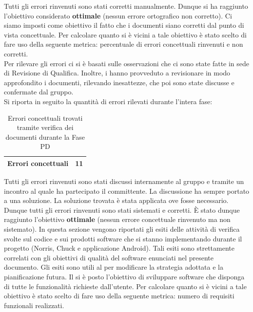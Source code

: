 				Tutti gli errori rinvenuti sono stati corretti manualmente. Dunque si ha raggiunto l'obiettivo considerato \textbf{ottimale} (nessun errore ortografico non corretto).
				Ci siamo imposti come obiettivo il fatto che i documenti siano corretti dal punto di vista concettuale. Per calcolare quanto si è vicini a tale obiettivo è stato scelto di fare uso della seguente metrica: percentuale di errori concettuali rinvenuti e non corretti.\\
				Per rilevare gli errori ci si è basati sulle osservazioni che ci sono state fatte in sede di Revisione di Qualifica. Inoltre, i  hanno provveduto a revisionare in modo approfondito i documenti, rilevando inesattezze, che poi sono state discusse e confermate dal gruppo.\\
				Si riporta in seguito la quantità di errori rilevati durante l'intera fase:
				\begin{table}[H]
					\centering
						\begin{tabu}{| l | c |} \hline
							Errori concettuali & 11\\ \hline
						\end{tabu}
					\caption{Errori concettuali trovati tramite verifica dei documenti durante la Fase PD}
				\end{table}
				Tutti gli errori rinvenuti sono stati discussi internamente al gruppo e tramite un incontro al quale ha partecipato il committente. La discussione ha sempre portato a una soluzione. La soluzione trovata è stata applicata ove fosse necessario. Dunque tutti gli errori rinvenuti sono stati sistemati e corretti. È stato dunque raggiunto l'obiettivo \textbf{ottimale} (nessun errore concettuale rinvenuto ma non sistemato).
			In questa sezione vengono riportati gli esiti delle attività di verifica svolte sul codice e sui prodotti software che si stanno implementando durante il progetto (Norris, Chuck e applicazione Android). Tali esiti sono strettamente correlati con gli obiettivi di qualità del software enunciati nel presente documento. Gli esiti sono utili al  per modificare la strategia adottata e la pianificazione futura.
				Il \groupname si è posto l'obiettivo di sviluppare software che disponga di tutte le funzionalità richieste dall'utente. Per calcolare quanto si è vicini a tale obiettivo è stato scelto di fare uso della seguente metrica: numero di requisiti funzionali realizzati.\\
